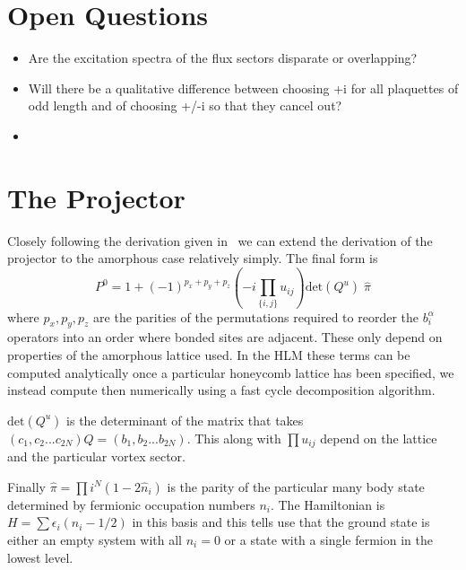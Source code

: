 

\section{Open Questions}
\begin{itemize}
    \item Are the excitation spectra of the flux sectors disparate or overlapping?
    \item Will there be a qualitative difference between choosing +i for all plaquettes of odd length and of choosing +/-i so that they cancel out?
    \item
\end{itemize}

\section{The Projector}
Closely following the derivation given in~\cite{} we can extend the derivation of the projector to the amorphous case relatively simply. The final form is
\[P^0 = 1 + (-1)^{p_x + p_y + p_z} \left(-i \prod_{\{i,j\}} u_{ij}\right) \mathrm{det}(Q^u) \; \hat{\pi} \] 
where \(p_x,p_y,p_z\) are the parities of the permutations required to reorder the \(b^\alpha_i\) operators into an order where bonded sites are adjacent. These only depend on properties of the amorphous lattice used. In the HLM these terms can be computed analytically once a particular honeycomb lattice has been specified, we instead compute then numerically using a fast cycle decomposition algorithm.

\(\mathrm{det}(Q^u)\) is the determinant of the matrix that takes \((c_1, c_2... c_{2N}) Q = (b_1, b_2... b_{2N})\). This along with \(\prod u_{ij}\) depend on the lattice and the particular vortex sector. 

Finally \(\hat{\pi} = \prod{i}^{N} (1 - 2\hat{n}_i)\) is the parity of the particular many body state determined by fermionic occupation numbers \(n_i\). The Hamiltonian is \(H = \sum \epsilon_i (n_i - 1/2)\) in this basis and this tells use that the ground state is either an empty system with all \(n_i = 0\) or a state with a single fermion in the lowest level. 

